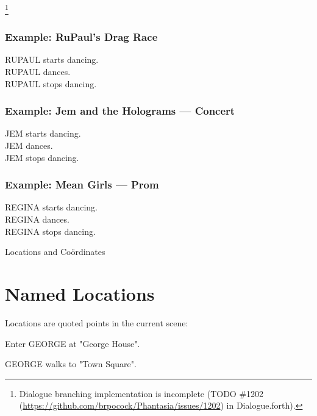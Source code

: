 \documentclass[11pt,letterpaper,oldstylefigures]{memoir}
\makeatletter
\newcommand{\stagedir}[1]{#1\par\vspace{1\baselineskip}}
\newenvironment{FountainExample}
  {\begingroup
  \ttfamily\small
   \setlength{\parindent}{0pt}
  \setlength{\parskip}{0.5em}
  \allowdisplaybreaks
  \setlength{\displaywidowpenalty}{0}
  \setlength{\widowpenalty}{0}
  \setlength{\clubpenalty}{0}
  \setlength{\interlinepenalty}{0}
}
  {\endgroup}
\let\oldchapter\chapter
\def\chapter{%
  \@ifstar
    {\FountainScripting@starchapter}%
    {\@dblarg\FountainScripting@chapter}}
\def\FountainScripting@starchapter#1{\oldchapter*{#1}\chaptermark{#1}}
\def\FountainScripting@chapter[#1]#2{\oldchapter[#1]{#2}\chaptermark{#2}}
\newcommand{\paragraphbreak}{\vspace{0.5em}}
\makeatother
\begin{document}
\footnote{Dialogue branching implementation is incomplete (TODO \#1202 (\href{https://github.com/brpocock/Phantasia/issues/1202}{https://github.com/brpocock/Phantasia/issues/1202}) in Dialogue.forth).}

\paragraphbreak

\subsubsection{Example: RuPaul's Drag Race}
\begin{FountainExample}
RUPAUL starts dancing.\\
RUPAUL dances.\\
RUPAUL stops dancing.
\end{FountainExample}

\paragraphbreak

\subsubsection{Example: Jem and the Holograms — Concert}
\begin{FountainExample}
JEM starts dancing.\\
JEM dances.\\
JEM stops dancing.
\end{FountainExample}

\paragraphbreak

\subsubsection{Example: Mean Girls — Prom}
\begin{FountainExample}
REGINA starts dancing.\\
REGINA dances.\\
REGINA stops dancing.
\end{FountainExample}

\chapter{Locations and Coördinates}

\section{Named Locations}

Locations are quoted points in the current scene:

\begin{FountainExample}
\stagedir{Enter GEORGE at "George House".}
GEORGE walks to "Town Square".
\end{FountainExample}
\end{document}
